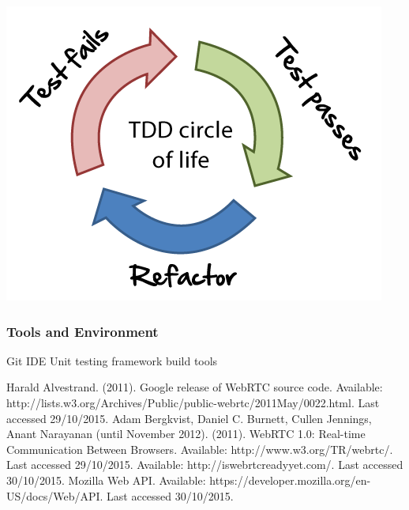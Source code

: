 \documentclass[]{report}
\begin{document}
		\begin{center}
			\includegraphics[scale=0.5]{tdd-circle-of-life.png}
		\end{center}
		
		\subsubsection*{Tools and Environment}
		Git
		IDE
		Unit testing framework
		build tools
		
	\begin{thebibliography}{9}
		Harald Alvestrand. (2011). Google release of WebRTC source code. Available: http://lists.w3.org/Archives/Public/public-webrtc/2011May/0022.html. Last accessed 29/10/2015.
		Adam Bergkvist, Daniel C. Burnett, Cullen Jennings, Anant Narayanan (until November 2012). (2011). WebRTC 1.0: Real-time Communication Between Browsers. Available: http://www.w3.org/TR/webrtc/. Last accessed 29/10/2015.
		Available: http://iswebrtcreadyyet.com/. Last accessed 30/10/2015.
		Mozilla Web API. Available: https://developer.mozilla.org/en-US/docs/Web/API. Last accessed 30/10/2015.
	\end{thebibliography}
\end{document}
